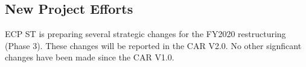 \subsection{New Project Efforts}
ECP ST is preparing several strategic changes for the FY2020 restructuring (Phase 3).   These changes will be reported in the CAR V2.0.  No other signficant changes have been made since the CAR V1.0.


%
%
%

